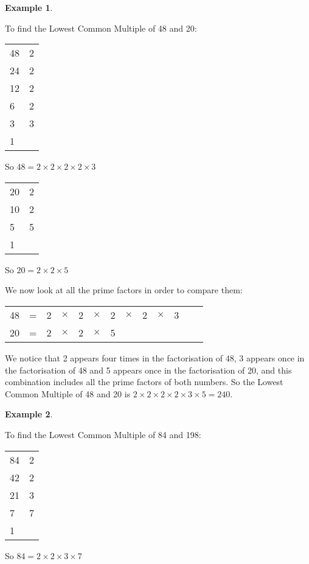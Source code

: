 \documentclass[11pt, oneside]{article}
\theoremstyle{definition}
\newtheorem{exmp}{Example}[section]
\begin{document}
\begin{exmp} \end{exmp}
To find the Lowest Common Multiple of 48 and 20:

\begin{tabular}{ p{0.5cm} | p{1.5cm}}
48 & 2  \\
24 & 2  \\
12 & 2  \\
6 & 2  \\
3 & 3  \\
1 &  
\end{tabular}

So $48 = 2 \times 2 \times 2 \times 2 \times 3$

\bigbreak

\begin{tabular}{ p{0.5cm} | p{1.5cm}}
20 & 2  \\
10 & 2  \\
5 & 5  \\
1 
\end{tabular}

So $20 = 2\times 2 \times 5$

We now look at all the prime factors in order to compare them:

\begin{tabular}{c c c c c c c c c c c c c}
48 & = & 2 & $\times$ & 2 & $\times$ & 2 & $\times$ & 2 & $\times$ & 3 &  &  \\
20 & = & 2 & $\times$ & 2 & $\times$ & 5 &  &  &  &  &  & 
\end{tabular}

We notice that 2 appears four times in the factorisation of 48, 3 appears once in the factorisation of 48 and 5 appears once in the factorisation of 20, and this combination includes all the prime factors of both numbers. So the Lowest Common Multiple of 48 and 20 is $2\times 2 \times 2 \times 2 \times 3 \times 5 = 240$.

\begin{exmp} \end{exmp}
To find the Lowest Common Multiple of 84 and 198:

\begin{tabular}{ p{0.5cm} | p{1.5cm}}
84 & 2  \\
42 & 2  \\
21 & 3  \\
7 & 7  \\
1 &  
\end{tabular}

So $84 = 2 \times 2 \times 3 \times 7$
\end{document}
